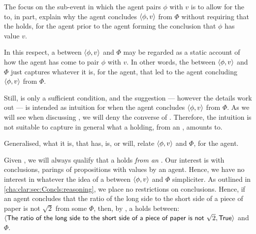 \begin{note}
  The focus on the sub-event in which the agent pairs \(\phi\) with \(v\) is to allow for the \ros{} to, in part, explain why the agent concludes \(\langle \phi, v \rangle\) from \(\Phi\) without requiring that the \ros{} holds, for the agent prior to the agent forming the conclusion that \(\phi\) has value \(v\).

  In this respect, a \ros{} between \(\langle \phi, v \rangle\) and \(\Phi\) may be regarded as a static account of how the agent has come to pair \(\phi\) with \(v\).
  In other words, the \ros{} between \(\langle \phi, v \rangle\) and \(\Phi\) just captures whatever it is, for the agent, that led to the agent concluding \(\langle \phi, v \rangle\) from \(\Phi\).

  Still, \supportI{} is only a sufficient condition, and the suggestion --- however the details work out --- is intended as intuition for when the agent concludes \(\langle \phi, v \rangle\) from \(\Phi\).
  As we will see when discussing \supportII{}, we will deny the converse of \supportI{}.
  Therefore, the intuition is not suitable to capture in general what a \ros{} holding, from an \agpe{}, amounts to.

  Generalised, what it is, that has, is, or will, relate \(\langle \phi, v \rangle\) and \(\Phi\), for the agent.
\end{note}

\begin{note}
  Given \supportI{}, we will always qualify that a \ros{} holds \emph{from an \agpe{}}.
  Our interest is with conclusions, parings of propositions with values by an agent.
  Hence, we have no interest in whatever the idea of a \ros{} between \(\langle \phi, v \rangle\) and \(\Phi\) simpliciter.
  As outlined in \autoref{cha:clar:sec:Concls:reasoning}, we place no restrictions on conclusions.
  Hence, if an agent concludes that the ratio of the long side to the short side of a piece of paper is not \(\sqrt{2}\) from some \pool{} \(\Phi\), then, by \supportI{}, a \ros{} holds between:
  \(\pv{\prop{The ratio of the long side to the short side of a piece of paper is not }\sqrt{2}}{\val{True}}\) and \(\Phi\).
\end{note}

